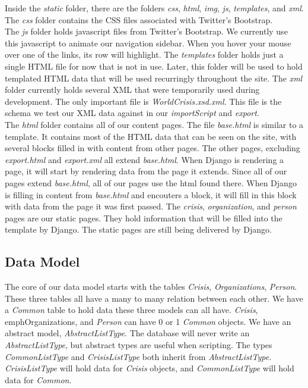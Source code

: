 \documentclass[12pt]{report}
\begin{document}
Inside the \emph{static} folder, there are the folders \emph{css}, \emph{html}, \emph{img}, \emph{js}, \emph{templates}, and \emph{xml}.
The \emph{css} folder contains the CSS files associated with Twitter's Bootstrap.\\


The \emph{js} folder holds javascript files from Twitter's Bootstrap.
We currently use this javascript to animate our navigation sidebar.
When you hover your mouse over one of the links, its row will highlight.
The \emph{templates} folder holds just a single HTML file for now that is not in use.
Later, this folder will be used to hold templated HTML data that will be used recurringly throughout the site.
The \emph{xml} folder currently holds several XML that were temporarily used during development.
The only important file is \emph{WorldCrisis.xsd.xml}.
This file is the schema we test our XML data against in our \emph{importScript} and \emph{export}.\\


The \emph{html} folder contains all of our content pages.
The file \emph{base.html} is similar to a template.
It contains most of the HTML data that can be seen on the site, with several blocks filled in with content from other pages.
The other pages, excluding \emph{export.html} and \emph{export.xml} all extend \emph{base.html}.
When Django is rendering a page, it will start by rendering data from the page it extends.
Since all of our pages extend \emph{base.html}, all of our pages use the html found there.
When Django is filling in content from \emph{base.html} and encouters a block,
it will fill in this block with data from the page it was first passed.
The \emph{crisis}, \emph{organization}, and \emph{person} pages are our static pages.
They hold information that will be filled into the template by Django.
The static pages are still being delivered by Django.\\


\subsection*{Data Model}
\hfill


The core of our data model starts with the tables \emph{Crisis}, \emph{Organizations}, \emph{Person}.
These three tables all have a many to many relation between each other.
We have a \emph{Common} table to hold data these three models can all have.
\emph{Crisis}, emph{Organizations}, and \emph{Person} can have 0 or 1 \emph{Common} objects.
We have an abstract model, \emph{AbstractListType}.
The database will never write an \emph{AbstractListType}, but abstract types are useful when scripting.
The types \emph{CommonListType} and \emph{CrisisListType} both inherit from \emph{AbstractListType}.
\emph{CrisisListType} will hold data for \emph{Crisis} objects, and \emph{CommonListType} will hold data for \emph{Common}.
\end{document}
